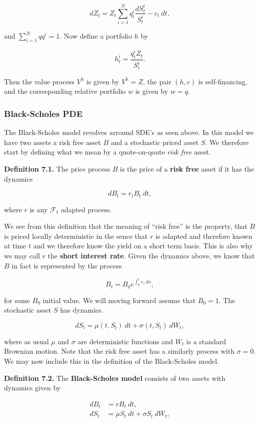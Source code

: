 \documentclass[
]{article}
\begin{document}
\[
dZ_t=Z_t\sum_{i=1}^N q_t^i\frac{dS_t^i}{S_t^i}-c_t\ dt,
\]

and \(\sum_{i=1}^Nqq^i=1\). Now define a portfolio \(h\) by

\[
h_t^i=\frac{q_t^iZ_t}{S_t^i}.
\]

Then the value process \(V^h\) is given by \(V^h=Z\), the pair \((h,c)\)
is self-financing, and the corresponding relative portfolio \(w\) is
given by \(w=q\).

\hypertarget{black-scholes-pde}{%
\subsubsection{Black-Scholes PDE}\label{black-scholes-pde}}

The Black-Scholes model revolves arround SDE's as seen above. In this
model we have two assets a risk free asset \(B\) and a stochastic priced
asset \(S\). We therefore start by defining what we mean by a
quote-on-qoute \emph{risk free} asset.

\textbf{Definition 7.1.} The price process \(B\) is the price of a
\textbf{risk free} asset if it has the dynamics

\[
dB_t=r_t B_t\ dt,
\]

where \(r\) is any \(\mathcal{F}_t\) adapted process.

We see from this definition that the meaning of ``risk free'' is the
property, that \(B\) is priced locally deterministic in the sence that
\(r\) is adapted and therefore known at time \(t\) and we therefore know
the yield on a short term basis. This is also why we may call \(r\) the
\textbf{short interest rate}. Given the dynamics above, we know that
\(B\) in fact is represented by the process

\[
B_t=B_0e^{\int_0^tr_s\ ds},
\]

for some \(B_0\) initial value. We will moving forward assume that
\(B_0=1\). The stochastic asset \(S\) has dynamics.

\[
dS_t=\mu(t,S_t)\ dt + \sigma(t,S_t)\ dW_t,
\]

where as usual \(\mu\) and \(\sigma\) are deterministic functions and
\(W_t\) is a standard Brownian motion. Note that the risk free asset has
a similarly process with \(\sigma = 0\). We may now include this in the
definition of the Black-Scholes model.

\textbf{Definition 7.2.} The \textbf{Black-Scholes model} consists of
two assets with dynamics given by

\begin{align*}
dB_t&=rB_t\ dt,\\
dS_t&=\mu S_t\ dt+\sigma S_t\ dW_t,
\end{align*}
\end{document}
